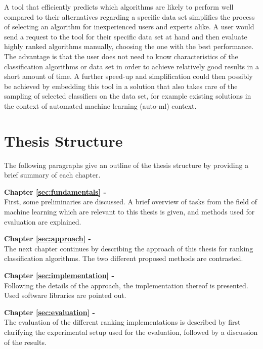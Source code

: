 A tool that efficiently predicts which algorithms are likely to perform well compared to their alternatives regarding a specific data set simplifies the process of selecting an algorithm for inexperienced users and experts alike. A user would send a request to the tool for their specific data set at hand and then evaluate highly ranked algorithms manually, choosing the one with the best performance. The advantage is that the user does not need to know characteristics of the classification algorithms or data set in order to achieve relatively good results in a short amount of time. A further speed-up and simplification could then possibly be achieved by embedding this tool in a solution that also takes care of the sampling of selected classifiers on the data set, for example existing solutions in the context of automated machine learning (auto-ml) context.

\section{Thesis Structure}
\label{sec:intro:structure}
The following paragraphs give an outline of the thesis structure by providing a brief summary of each chapter.

\textbf{Chapter \ref{sec:fundamentals} - } \\[0.2em]
First, some preliminaries are discussed. A brief overview of tasks from the field of machine learning which are relevant to this thesis is given, and methods used for evaluation are explained. 

\textbf{Chapter \ref{sec:approach} - } \\[0.2em]
The next chapter continues by describing the approach of this thesis for ranking classification algorithms. The two different proposed methods are contrasted.

\textbf{Chapter \ref{sec:implementation} - } \\[0.2em]
Following the details of the approach, the implementation thereof is presented. Used software libraries are pointed out.

\textbf{Chapter \ref{sec:evaluation} - } \\[0.2em]
The evaluation of the different ranking implementations is described by first clarifying the experimental setup used for the evaluation, followed by a discussion of the results.

